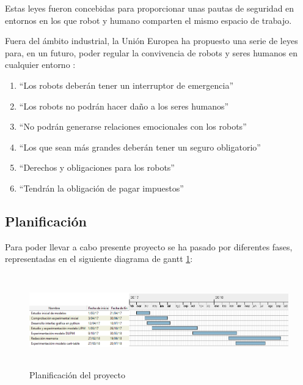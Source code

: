 Estas leyes fueron concebidas para proporcionar unas pautas de seguridad en entornos en los que robot y humano comparten el mismo espacio de trabajo.

Fuera del ámbito industrial, la Unión Europea ha propuesto una serie de leyes para, en un futuro, poder regular la convivencia de robots y seres humanos en cualquier entorno \cite{ref1}:

\begin{enumerate}

\item ``Los robots deberán tener un interruptor de emergencia''

\item ``Los robots no podrán hacer daño a los seres humanos''

\item ``No podrán generarse relaciones emocionales con los robots''

\item ``Los que sean más grandes deberán tener un seguro obligatorio''

\item ``Derechos y obligaciones para los robots''

\item ``Tendrán la obligación de pagar impuestos''

\end{enumerate}

\newpage

\subsection{Planificación}

Para poder llevar a cabo presente proyecto se ha pasado por diferentes fases, representadas en el siguiente diagrama de gantt \ref{figura2}:

\begin{figure}[H]
\centering
\includegraphics[width=15cm, height=4cm]{imagenes/apartado_1/12_planificacion_v1}
\caption{Planificación del proyecto}
\label{figura2}
\end{figure}

